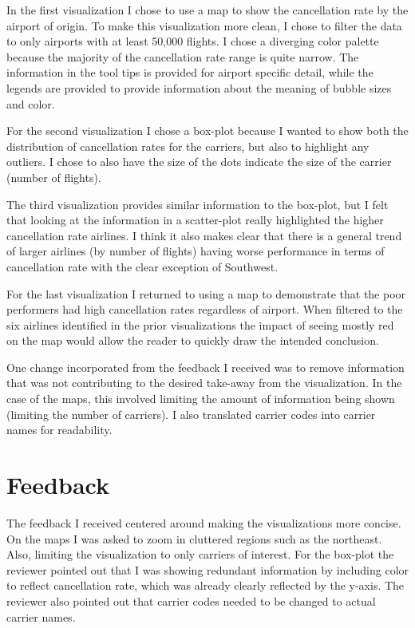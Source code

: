 \documentclass[a4paper,11pt]{report}
\begin{document}
In the first visualization I chose to use a map to show the cancellation rate by
the airport of origin.  To make this visualization more clean, I chose to filter
the data to only airports with at least 50,000 flights.  I chose a diverging
color palette because the majority of the cancellation rate range is quite
narrow.  The information in the tool tips is provided for airport specific
detail, while the legends are provided to provide information about the meaning
of bubble sizes and color.

For the second visualization I chose a box-plot because I wanted to show both
the distribution of cancellation rates for the carriers, but also to highlight
any outliers.  I chose to also have the size of the dots indicate the size of
the carrier (number of flights).

The third visualization provides similar information to the box-plot, but I felt
that looking at the information in a scatter-plot really highlighted the higher
cancellation rate airlines.  I think it also makes clear that there is a general
trend of larger airlines (by number of flights) having worse performance in
terms of cancellation rate with the clear exception of Southwest.

For the last visualization I returned to using a map to demonstrate that the
poor performers had high cancellation rates regardless of airport.  When
filtered to the six airlines identified in the prior visualizations the impact
of seeing mostly red on the map would allow the reader to quickly draw the
intended conclusion.



One change incorporated from the feedback I received was to remove information
that was not contributing to the desired take-away from the visualization.  In
the case of the maps, this involved limiting the amount of information being
shown (limiting the number of carriers).  I also translated carrier codes into
carrier names for readability.

\section{Feedback}
The feedback I received centered around making the visualizations more concise.
On the maps I was asked to zoom in cluttered regions such as the
northeast.  Also, limiting the visualization to only carriers of interest.  For
the box-plot the reviewer pointed out that I was showing redundant information by
including color to reflect cancellation rate, which was already clearly
reflected by the y-axis.  The reviewer also pointed out that carrier codes
needed to be changed to actual carrier names.
\end{document}
